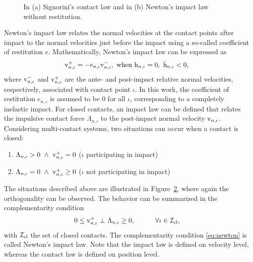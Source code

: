 \documentclass[../DC2019003Bouma.tex]{subfiles}
\begin{document}
\begin{figure}[bt!]
\begin{subfigure}{0.3\textwidth}
\caption{}\label{fig:newtonimpact}
\end{subfigure}
\caption{In \textnormal{(a)} Signorini's contact law and in \textnormal{(b)} Newton's impact law without restitution.}
\end{figure}
Newton's impact law relates the normal velocities at the contact points after impact to the normal velocities just before the impact using a so-called coefficient of restitution $e$. Mathematically, Newton's impact law can be expressed as
\begin{align}
\mathrm{v}^+_{n,\iota} = -e_{n,\iota}\mathrm{v}^-_{n,\iota},\text{ when }\mathrm{h}_{n,\iota}=0,\ \dot{\mathrm{h}}_{n,\iota}<0,
\end{align}
%
%
where $\mathrm{v}^-_{n,\iota}$ and $\mathrm{v}^+_{n,\iota}$ are the ante- and post-impact relative normal velocities, respectively, associated with contact point $\iota$. In this work, the coefficient of restitution $e_{n,\iota}$ is assumed to be $0$ for all $\iota$, corresponding to a completely inelastic impact. For closed contacts, an impact law can be defined that relates the impulsive contact force $\Lambda_{n,\iota}$ to the post-impact normal velocity $\mathrm{v}_{n,\iota}$. Considering multi-contact systems, two situations can occur when a contact is closed:
\begin{enumerate}
\item $\Lambda_{n,\iota} > 0\ \wedge\ \vrm^+_{n,\iota} = 0$ ($\iota$ participating in impact)
\item $\Lambda_{n,\iota} = 0\ \wedge\ \vrm^+_{n,\iota} \geq 0$ ($\iota$ not participating in impact)
\end{enumerate}
The situations described above are illustrated in Figure~\ref{fig:newtonimpact}, where again the orthogonality can be observed. The behavior can be summarized in the complementarity condition
\begin{align}
0\leq \mathrm{v}^+_{n,\iota}\ \bot\ \Lambda_{n,\iota} \geq 0,\quad  \qquad \forall \iota\in\mathcal{I}_{\text{cl}},\label{eq:newton}
\end{align}
with $\mathcal{I}_{\text{cl}}$ the set of closed contacts. The complementarity condition \eqref{eq:newton} is called Newton's impact law. Note that the impact law is defined on velocity level, whereas the contact law is defined on position level.
\end{document}
